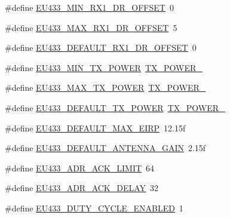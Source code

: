 \begin{DoxyCompactItemize}
\item 
\#define \mbox{\hyperlink{group___r_e_g_i_o_n_e_u433_gad92faa53973ac3aae8a74d648c474291}{E\+U433\+\_\+\+M\+I\+N\+\_\+\+R\+X1\+\_\+\+D\+R\+\_\+\+O\+F\+F\+S\+ET}}~0
\item 
\#define \mbox{\hyperlink{group___r_e_g_i_o_n_e_u433_gaea252feca5f849ceb5d54ce51c90cab8}{E\+U433\+\_\+\+M\+A\+X\+\_\+\+R\+X1\+\_\+\+D\+R\+\_\+\+O\+F\+F\+S\+ET}}~5
\item 
\#define \mbox{\hyperlink{group___r_e_g_i_o_n_e_u433_ga0e7f38f989f846d6abcf94eb74e19fc0}{E\+U433\+\_\+\+D\+E\+F\+A\+U\+L\+T\+\_\+\+R\+X1\+\_\+\+D\+R\+\_\+\+O\+F\+F\+S\+ET}}~0
\item 
\#define \mbox{\hyperlink{group___r_e_g_i_o_n_e_u433_gadb49eb1bda0c5ae6b68eb817bf4d4810}{E\+U433\+\_\+\+M\+I\+N\+\_\+\+T\+X\+\_\+\+P\+O\+W\+ER}}~\mbox{\hyperlink{group___r_e_g_i_o_n_ga0149d52581db80901b5bc1adf0aedd1d}{T\+X\+\_\+\+P\+O\+W\+E\+R\+\_}}
\item 
\#define \mbox{\hyperlink{group___r_e_g_i_o_n_e_u433_gaac93ce9446f1e4b5c3c09c9b2ebf2297}{E\+U433\+\_\+\+M\+A\+X\+\_\+\+T\+X\+\_\+\+P\+O\+W\+ER}}~\mbox{\hyperlink{group___r_e_g_i_o_n_gab33618449f2a573142c463ab071ef8ed}{T\+X\+\_\+\+P\+O\+W\+E\+R\+\_}}
\item 
\#define \mbox{\hyperlink{group___r_e_g_i_o_n_e_u433_gaeaf055dbd3b7262349329b190254bcae}{E\+U433\+\_\+\+D\+E\+F\+A\+U\+L\+T\+\_\+\+T\+X\+\_\+\+P\+O\+W\+ER}}~\mbox{\hyperlink{group___r_e_g_i_o_n_gab33618449f2a573142c463ab071ef8ed}{T\+X\+\_\+\+P\+O\+W\+E\+R\+\_}}
\item 
\#define \mbox{\hyperlink{group___r_e_g_i_o_n_e_u433_ga6011f60777820105e69f17467f75f960}{E\+U433\+\_\+\+D\+E\+F\+A\+U\+L\+T\+\_\+\+M\+A\+X\+\_\+\+E\+I\+RP}}~12.\+15f
\item 
\#define \mbox{\hyperlink{group___r_e_g_i_o_n_e_u433_gaecef7360c6c42e48c5a6f7a856511c3c}{E\+U433\+\_\+\+D\+E\+F\+A\+U\+L\+T\+\_\+\+A\+N\+T\+E\+N\+N\+A\+\_\+\+G\+A\+IN}}~2.\+15f
\item 
\#define \mbox{\hyperlink{group___r_e_g_i_o_n_e_u433_ga3e1ccf1b708f6851ff62811ee58bb37e}{E\+U433\+\_\+\+A\+D\+R\+\_\+\+A\+C\+K\+\_\+\+L\+I\+M\+IT}}~64
\item 
\#define \mbox{\hyperlink{group___r_e_g_i_o_n_e_u433_ga197b292bfc46b531e2d42a9e24f2fa0b}{E\+U433\+\_\+\+A\+D\+R\+\_\+\+A\+C\+K\+\_\+\+D\+E\+L\+AY}}~32
\item 
\#define \mbox{\hyperlink{group___r_e_g_i_o_n_e_u433_gace175cf02edd563e039993cdfd8464cf}{E\+U433\+\_\+\+D\+U\+T\+Y\+\_\+\+C\+Y\+C\+L\+E\+\_\+\+E\+N\+A\+B\+L\+ED}}~1
\item 

\end{DoxyCompactItemize}
